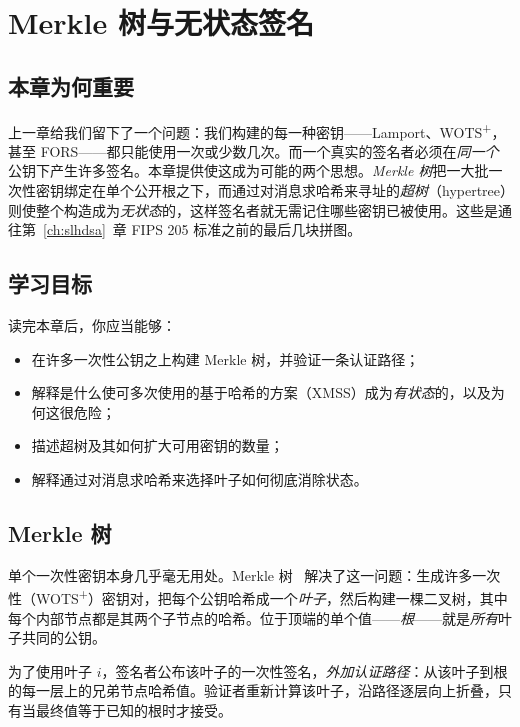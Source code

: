 \chapter{Merkle 树与无状态签名}
\label{ch:hashmerkle}

\section{本章为何重要}
上一章给我们留下了一个问题：我们构建的每一种密钥——Lamport、WOTS\textsuperscript{+}，甚至 FORS——都只能使用一次或少数几次。而一个真实的签名者必须在\emph{同一个}公钥下产生许多签名。本章提供使这成为可能的两个思想。\emph{Merkle 树}把一大批一次性密钥绑定在单个公开根之下，而通过对消息求哈希来寻址的\emph{超树}（hypertree）则使整个构造成为\emph{无状态}的，这样签名者就无需记住哪些密钥已被使用。这些是通往第~\ref{ch:slhdsa}~章 FIPS 205 标准之前的最后几块拼图。

\section{学习目标}
读完本章后，你应当能够：

\begin{itemize}
  \item 在许多一次性公钥之上构建 Merkle 树，并验证一条认证路径；
  \item 解释是什么使可多次使用的基于哈希的方案（XMSS）成为\emph{有状态}的，以及为何这很危险；
  \item 描述超树及其如何扩大可用密钥的数量；
  \item 解释通过对消息求哈希来选择叶子如何彻底消除状态。
\end{itemize}

\section{Merkle 树}
单个一次性密钥本身几乎毫无用处。Merkle 树~\cite{merkle1987} 解决了这一问题：生成许多一次性（WOTS\textsuperscript{+}）密钥对，把每个公钥哈希成一个\emph{叶子}，然后构建一棵二叉树，其中每个内部节点都是其两个子节点的哈希。位于顶端的单个值——\emph{根}——就是\emph{所有}叶子共同的公钥。

为了使用叶子 $i$，签名者公布该叶子的一次性签名，\emph{外加}\emph{认证路径}：从该叶子到根的每一层上的兄弟节点哈希值。验证者重新计算该叶子，沿路径逐层向上折叠，只有当最终值等于已知的根时才接受。

